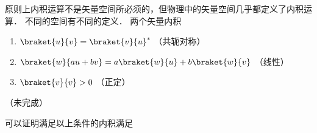 

原则上内积运算不是矢量空间所必须的，但物理中的矢量空间几乎都定义了内积运算． 不同的空间有不同的定义． 两个矢量内积

\begin{enumerate}
\item $\braket{u}{v} = \braket{v}{u}^*$ （共轭对称）
\item $\braket{w}{a u + b v} = a\braket{w}{u} + b\braket{w}{v}$ （线性）
\item $\braket{v}{v} > 0$ （正定）
\end{enumerate}

（未完成）

可以证明满足以上条件的内积满足